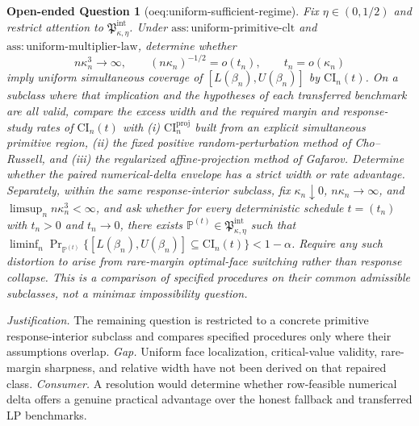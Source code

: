 \documentclass{article}
\newtheorem{openendedquestion}{Open-ended Question}
\begin{document}
\begin{openendedquestion}[oeq:uniform-sufficient-regime]\label{oeq:uniform-sufficient-regime}
Fix \(\eta\in(0,1/2)\) and restrict attention to \(\mathfrak P_{\kappa,\eta}^{\mathrm{int}}\).  Under \(\mathrm{ass:uniform\text{-}primitive\text{-}clt}\) and \(\mathrm{ass:uniform\text{-}multiplier\text{-}law}\), determine whether
\[
n\kappa_n^3\to\infty,
\qquad
(n\kappa_n)^{-1/2}=o(t_n),
\qquad
t_n=o(\kappa_n)
\]
imply uniform simultaneous coverage of \([L(\beta_n),U(\beta_n)]\) by \(\mathrm{CI}_n(t)\).  On a subclass where that implication and the hypotheses of each transferred benchmark are all valid, compare the excess width and the required margin and response-study rates of \(\mathrm{CI}_n(t)\) with (i) \(\mathrm{CI}_n^{\mathrm{proj}}\) built from an explicit simultaneous primitive region, (ii) the fixed positive random-perturbation method of Cho--Russell, and (iii) the regularized affine-projection method of Gafarov.  Determine whether the paired numerical-delta envelope has a strict width or rate advantage.  Separately, within the same response-interior subclass, fix \(\kappa_n\downarrow0\), \(n\kappa_n\to\infty\), and \(\limsup_n n\kappa_n^3<\infty\), and ask whether for every deterministic schedule \(t=(t_n)\) with \(t_n>0\) and \(t_n\to0\), there exists \(\mathbb P^{(t)}\in\mathfrak P_{\kappa,\eta}^{\mathrm{int}}\) such that \(\liminf_n\Pr_{\mathbb P^{(t)}}\{[L(\beta_n),U(\beta_n)]\subseteq\mathrm{CI}_n(t)\}<1-\alpha\). Require any such distortion to arise from rare-margin optimal-face switching rather than response collapse.  This is a comparison of specified procedures on their common admissible subclasses, not a minimax impossibility question.
\end{openendedquestion}
\par\smallskip\noindent \textit{Justification.} The remaining question is restricted to a concrete primitive response-interior subclass and compares specified procedures only where their assumptions overlap. \textit{Gap.} Uniform face localization, critical-value validity, rare-margin sharpness, and relative width have not been derived on that repaired class. \textit{Consumer.} A resolution would determine whether row-feasible numerical delta offers a genuine practical advantage over the honest fallback and transferred LP benchmarks.
\end{document}
